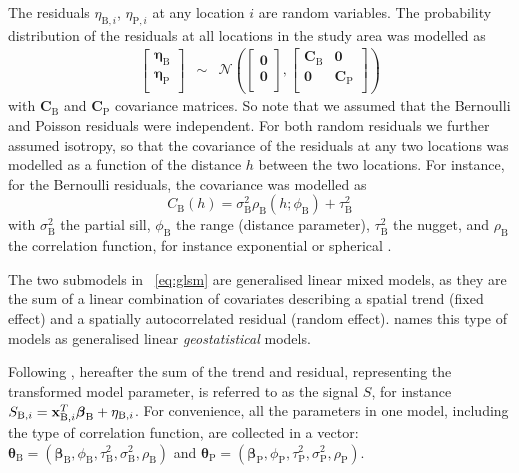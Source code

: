\documentclass[review]{elsarticle}
\begin{document}
The residuals $\eta_{\mathrm{B},i}$, $\eta_{\mathrm{P},i}$ at any location $i$ are random variables. The probability distribution of the residuals at all locations in the study area was modelled as
\begin{eqnarray}
\left[
\begin{array}{c}
\boldsymbol{\eta}_{\mathrm{B}} \\
\boldsymbol{\eta}_{\mathrm{P}} \\
\end{array}
\right]&\sim& \mathcal{N}\left(
\left[
\begin{array}{c}
\mathbf{0} \\
\mathbf{0} \\
\end{array}
\right],
\left[
\begin{array}{cc}
\mathbf{C}_{\mathrm{B}} & \mathbf{0} \\
\mathbf{0} & \mathbf{C}_{\mathrm{P}} \\
\end{array}
\right]
\right)
\end{eqnarray}
with $\mathbf{C}_{\mathrm{B}}$ and $\mathbf{C}_{\mathrm{P}}$ covariance matrices. So note that we assumed that the Bernoulli and Poisson residuals were independent. For both random residuals we further assumed isotropy, so that the covariance of the residuals at any two locations was modelled as a function of the distance $h$ between the two locations. For instance, for the Bernoulli residuals, the covariance was modelled as
\begin{equation}
    C_{\mathrm{B}}(h)=\sigma_{\mathrm{B}}^{2}\rho_{\mathrm{B}}(h; \phi_{\mathrm{B}})+\tau_{\mathrm{B}}^{2} \label{Ch}
\end{equation}
with $\sigma_{\mathrm{B}}^{2}$ the partial sill, $\phi_{\mathrm{B}}$ the range (distance parameter), $\tau_{\mathrm{B}}^{2}$ the nugget, and $\rho_{\mathrm{B}}$ the correlation function, for instance exponential or spherical \citep{webster2007}.

The two submodels in ~\ref{eq:glsm} are generalised linear mixed models, as they are the sum of a linear combination of covariates describing a spatial trend (fixed effect) and a spatially autocorrelated residual (random effect). \citet{diggle2007} names this type of models as generalised linear \textit{geostatistical} models.

Following \citet{diggle2007}, hereafter the sum of the trend and residual, representing the transformed model parameter, is referred to as the signal $S$, for instance $S_{\mathrm{B},i}= \mathbf{x}_{\mathrm{B},i}^{T}\boldsymbol{\beta}_{\rm{B}} + \eta_{\mathrm{B},i}$. For convenience, all the parameters in one model, including the type of correlation function, are collected in  a vector: $\boldsymbol{\theta}_{\mathrm{B}}=(\boldsymbol{\beta}_{\mathrm{B}}, \phi_{\mathrm{B}}, \tau_{\mathrm{B}}^2, \sigma_{\mathrm{B}}^2, \rho_{\mathrm{B}})$ and $\boldsymbol{\theta}_{\mathrm{P}}=(\boldsymbol{\beta}_{\mathrm{P}}, \phi_{\mathrm{P}}, \tau_{\mathrm{P}}^2, \sigma_{\mathrm{P}}^2, \rho_{\mathrm{P}})$.
\end{document}
